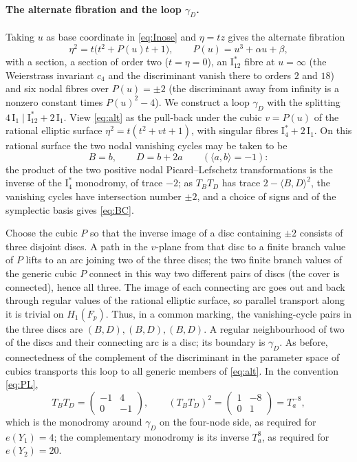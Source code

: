 \documentclass[11pt]{article}
\newcommand{\I}{\mathrm{I}}
\theoremstyle{definition}
\theoremstyle{remark}
\begin{document}
\paragraph{The alternate fibration and the loop \(\gamma_D\).}
Taking \(u\) as base coordinate in \eqref{eq:Inose} and \(\eta=tz\)
gives the alternate fibration
\begin{equation}\label{eq:alt}
 \eta^2=t\bigl(t^2+P(u)t+1\bigr),\qquad P(u)=u^3+\alpha u+\beta ,
\end{equation}
with a section, a section of order two (\(t=\eta=0\)), an
\(\I_{12}^*\) fibre at \(u=\infty\) (the Weierstrass invariant \(c_4\)
and the discriminant vanish there to orders \(2\) and \(18\)) and six nodal fibres over
\(P(u)=\pm2\) (the discriminant away from infinity is a nonzero
constant times \(P(u)^2-4\)). We construct a loop \(\gamma_D\) with
the splitting \(4\,\I_1\mid\I_{12}^*+2\,\I_1\). View \eqref{eq:alt} as the pull-back under the cubic \(v=P(u)\) of the
rational elliptic surface \(\eta^2=t(t^2+vt+1)\), with singular fibres
\(\I_4^*+2\,\I_1\). On this rational surface the two nodal vanishing
cycles may be taken to be
\begin{equation}\label{eq:BC}
 B=b,\qquad D=b+2a\qquad(\langle a,b\rangle=-1):
\end{equation}
the product of the two positive nodal Picard--Lefschetz
transformations is the inverse of the \(\I_4^*\) monodromy, of trace
\(-2\); as \(T_BT_D\) has trace \(2-\langle B,D\rangle^2\), the
vanishing cycles have intersection number \(\pm2\), and a choice of
signs and of the symplectic basis gives \eqref{eq:BC}.

Choose the cubic \(P\) so that the inverse image of a disc containing
\(\pm2\) consists of three disjoint discs. A path in the \(v\)-plane
from that disc to a finite branch value of \(P\) lifts to an arc
joining two of the three discs; the two finite branch values of the
generic cubic \(P\) connect in this way two different pairs of discs
(the cover is connected), hence all three. The image of each
connecting arc goes out and back through regular values of the
rational elliptic surface, so parallel transport along it is trivial
on \(H_1(F_p)\). Thus, in a common marking, the vanishing-cycle pairs
in the three discs are \((B,D),(B,D),(B,D)\). A regular
neighbourhood of two of the discs and their connecting arc is a disc;
its boundary is \(\gamma_D\). As before, connectedness of the
complement of the discriminant in the parameter space of cubics
transports this loop to all generic members of \eqref{eq:alt}. In the
convention \eqref{eq:PL},
\begin{equation}\label{eq:monodromy}
 T_BT_D=\left(\begin{smallmatrix}-1&4\\0&-1\end{smallmatrix}\right),
 \qquad
 (T_BT_D)^2=\left(\begin{smallmatrix}1&-8\\0&1\end{smallmatrix}\right)=T_a^{-8},
\end{equation}
which is the monodromy around \(\gamma_D\) on the four-node side, as
required for \(e(Y_1)=4\); the complementary monodromy is its inverse
\(T_a^{8}\), as required for \(e(Y_2)=20\).
\end{document}
